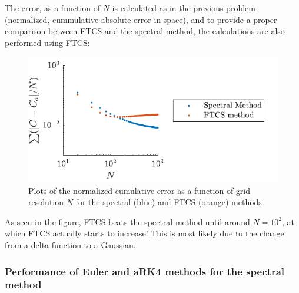\documentclass[a4paper,10pt]{article} 	%
\numberwithin{equation}{section}
\begin{document}
	The error, as a function of $ N $ is calculated as in the previous problem (normalized, cummulative absolute error in space), and to provide a proper comparison between FTCS and the spectral method, the calculations are also performed using FTCS:
	\begin{figure}[H]
		\centering
		\includegraphics[width=0.7\linewidth]{spectralError.pdf}
		\caption{Plots of the normalized cumulative error as a function of grid resolution $ N $ for the spectral (blue) and FTCS (orange) methods.}
		\label{fig:spectralError}
	\end{figure}
	As seen in the figure, FTCS beats the spectral method until around $ N = 10^2 $, at which FTCS actually starts to increase! This is most likely due to the change from a delta function to a Gaussian.
	
	\subsubsection{Performance of Euler and aRK4 methods for the spectral method}
	
\end{document}
